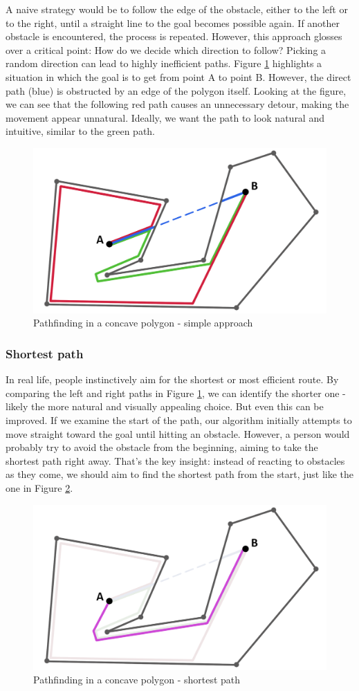 A naive strategy would be to follow the edge of the obstacle, either to the left or to the right, until a straight line to the goal becomes possible again. If another obstacle is encountered, the process is repeated. However, this approach glosses over a critical point: How do we decide which direction to follow? Picking a random direction can lead to highly inefficient paths. Figure \ref{fig:Path-P} highlights a situation in which the goal is to get from point A to point B. However, the direct path (blue) is obstructed by an edge of the polygon itself. Looking at the figure, we can see that the following red path causes an unnecessary detour, making the movement appear unnatural. Ideally, we want the path to look natural and intuitive, similar to the green path.

\begin{figure}[H]
\centering
\includegraphics[width=.65\linewidth]{img/polygon-prototyp.png}
\caption{Pathfinding in a concave polygon - simple approach}
\label{fig:Path-P}
\end{figure}

\subsubsection{Shortest path}
In real life, people instinctively aim for the shortest or most efficient route. By comparing the left and right paths in Figure \ref{fig:Path-P}, we can identify the shorter one - likely the more natural and visually appealing choice. But even this can be improved. If we examine the start of the path, our algorithm initially attempts to move straight toward the goal until hitting an obstacle. However, a person would probably try to avoid the obstacle from the beginning, aiming to take the shortest path right away. That’s the key insight: instead of reacting to obstacles as they come, we should aim to find the shortest path from the start, just like the one in Figure \ref{fig:Path-P2}.
 
\begin{figure}[H]
\centering
\includegraphics[width=.65\linewidth]{img/polygon-prototyp2.png}
\caption{Pathfinding in a concave polygon - shortest path}
\label{fig:Path-P2}
\end{figure}

